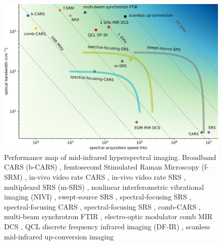 \documentclass{optica-article}
\begin{document}
\begin{figure}[H]
    \centering
    \includegraphics[width=\linewidth]{bckgnd_with_cm_v3.png}
    \caption{Performance map of mid-infrared hyperspectral imaging. Broadband CARS (b-CARS) \cite{keeSimpleApproachOnelaser2004}, femtosecond Stimulated Raman Microscopy (f-SRM) \cite{ploetzFemtosecondStimulatedRaman2007}, in-vivo video rate CARS \cite{evansChemicalImagingTissue2005}, in-vivo video rate SRS \cite{saarVideoRateMolecularImaging2010}, multiplexed SRS (m-SRS) \cite{fuQuantitativeChemicalImaging2012,liaoMicrosecondScaleVibrational2015}, nonlinear interferometric vibrational imaging (NIVI) \cite{chowdaryMolecularHistopathologySpectrally2010}, swept-source SRS \cite{ozekiHighspeedMolecularSpectral2012}, spectral-focusing SRS \cite{fuHyperspectralImagingStimulated2013}, spectral-focusing CARS \cite{dinapoliHyperspectralDifferentialCARS2014}, spectral-focusing SRS \cite{linMicrosecondFingerprintStimulated2021}, comb-CARS \cite{ideguchiCoherentRamanSpectroimaging2013}, multi-beam synchrotron FTIR \cite{nasseHighresolutionFouriertransformInfrared2011}, electro-optic modulator comb MIR DCS \cite{ullahkhanDirectHyperspectralDualcomb2020}, QCL discrete frequency infrared imaging (DF-IR) \cite{yehFastInfraredChemical2015}, scanless mid-infrared up-conversion imaging \cite{zhaoHighspeedScanlessEntire2023}}
    \label{fig:bckgnd}
\end{figure}

\end{document}
